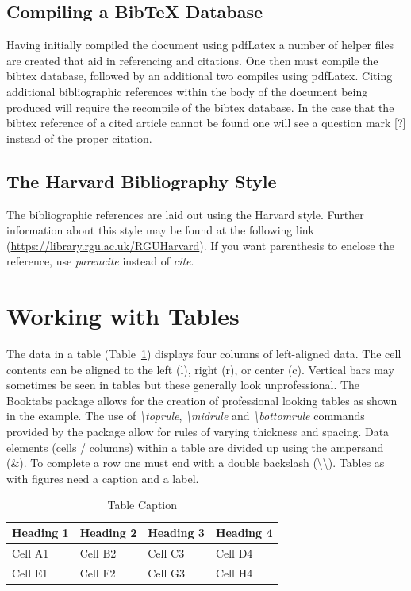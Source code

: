 \subsection{Compiling a BibTeX Database}

Having initially compiled the document using pdfLatex a number of helper files are created that aid in referencing and citations. One then must compile the bibtex database, followed by an additional two compiles using pdfLatex. Citing additional bibliographic references within the body of the document being produced will require the recompile of the bibtex database. In the case that the bibtex reference of a cited article cannot be found one will see a question mark [?] instead of the proper citation.

\subsection{The Harvard Bibliography Style}

The bibliographic references are laid out using the Harvard style. Further information about this style may be found at the following link (\url{https://library.rgu.ac.uk/RGUHarvard}). If you want parenthesis to enclose the reference, use \textit{parencite} instead of \textit{cite}.


\section{Working with Tables}

The data in a table (Table~\ref{tab:using:TableExample}) displays four columns of left-aligned data. The cell contents can be aligned to the left (l), right (r), or center (c). Vertical bars may sometimes be seen in tables but these generally look unprofessional. The Booktabs package \cite{web:Fear2005BookTabs} allows for the creation of professional looking tables as shown in the example.  The use of \emph{\textbackslash toprule}, \emph{\textbackslash midrule} and \emph{\textbackslash bottomrule} commands provided by the package allow for rules of varying thickness and spacing. Data elements (cells / columns) within a table are divided up using the ampersand (\&). To complete a row one must end with a double backslash (\textbackslash\textbackslash). Tables as with figures need a caption and a label.

\begin{table}[H]
\centering
\small
\begin{tabular}{llll}
\toprule \textbf{Heading 1}& \textbf{Heading 2}&\textbf{Heading 3}&\textbf{Heading 4}\\
\midrule
Cell A1 & Cell B2 & Cell C3 & Cell D4\\
Cell E1 & Cell F2 & Cell G3 & Cell H4\\
\bottomrule
\end{tabular}
\caption{Table Caption}\label{tab:using:TableExample}
\end{table}



